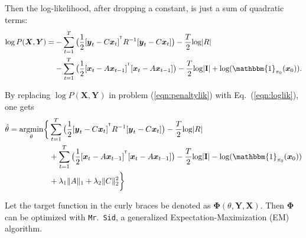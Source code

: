 \documentclass[fleqn,12pt]{article}
\let\oldref\ref
\renewcommand{\ref}[1]{(\oldref{#1})}
\newcommand{\T}{^{\ensuremath{\mathsf{T}}}}           %
\newcommand{\mrsid}{{\sc \texttt{Mr}.~\texttt{Sid}}}
\newcommand{\argmin}{\operatornamewithlimits{argmin}}
\providecommand{\mb}[1]{\boldsymbol{#1}}
\newcommand{\bx}{\mb{x}}
\newcommand{\by}{\mb{y}}
\newcommand{\bX}{\mb{X}}
\newcommand{\bY}{\mb{Y}}
\begin{document}
Then the log-likelihood, after dropping a constant, is just a sum of quadratic terms:
\begin{equation}\label{eqn:loglik}
\begin{split}
\log  P(\bX,\bY)=&-\sum\limits_{t=1}^{T}\big(\frac{1}{2}[\by_t-C\bx_t]^{\T}R^{-1}[\by_t-C\bx_t]\big)-\frac{T}{2}\text{log}|R|\\
&-\sum\limits_{t=1}^{T}\big(\frac{1}{2}[\bx_t-A\bx_{t-1}]^{\T}[\bx_t-A\bx_{t-1}]\big)-\frac{T}{2}\text{log}|\mathbf{I}|+ \text{log}(\mathbbm{1}_{\mathbf{\pi}_0}(\bx_0)).
\end{split}
\end{equation}

By replacing $\log  P(\bX,\bY)$ in problem \ref{eqn:penaltylik} with Eq.~\ref{eqn:loglik}, one gets
\begin{equation}\label{eqn:penaltylik2}
\begin{split}
\hat{\theta}=\argmin_{\substack{\theta}}\biggl\{&\sum\limits_{t=1}^{T}\big(\frac{1}{2}[\by_t-C\bx_t]^{\T}R^{-1}[\by_t-C\bx_t]\big)-\frac{T}{2}\text{log}|R|\\
&+\sum\limits_{t=1}^{T}\big(\frac{1}{2}[\bx_t-A\bx_{t-1}]^{\T}[\bx_t-A\bx_{t-1}]\big)-\frac{T}{2}\text{log}|\mathbf{I}| - \text{log}(\mathbbm{1}_{\mathbf{\pi}_0}(\bx_0))\\
&+\lambda_1\|A\|_1+\lambda_2\|C\|_2^2\biggr\}
\end{split}
\end{equation}

Let the target function in the curly braces be denoted  as $\mathbf{\Phi}(\theta,\bY,\bX)$. Then $\mathbf{\Phi}$ can be optimized with \mrsid, a generalized Expectation-Maximization (EM) algorithm.
\end{document}
